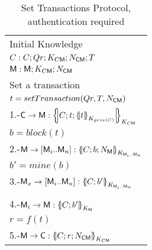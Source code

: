 \begin{table}[htb]
\footnotesize
\begin{center}
\caption{Set Transactions Protocol, authentication required}
\label{table:ProtSetTrans}
\begin{tabular}{|l|}
\hline
           Initial Knowledge                                                             \\
            $C:C; Qr ;  K_{C\textsf{M}} ; N_{\textsf{C}\textsf{M}} ; T$               \\
            $\textsf{M}: \textsf{M}; K_{C\textsf{M}} ; N_{\textsf{C}\textsf{M}}$    \\ \hline \hline 
           Set a transaction                                                                        \\
           \hspace{5mm} $t=setTransaction(Qr,T,N_{\textsf{C}\textsf{M}})$                                  \\  
           1.-$\Client\rightarrow \Server: \fat{C \lnk t \lnk \fat{t}_{K_{priv(C)}}}_{K_{C\Server}}$          \\ 
           \hspace{5mm} $b=block(t)$                                  \\  
           2.-$\Server\rightarrow [\Server_i .. \Server_n]: \fat{C \lnk b \lnk N_\Server}_{K_{\Server_i .. \Server_n}}$          \\ 
           \hspace{5mm} $b'=mine(b)$                                  \\  
           3.-$\Server_x\rightarrow [\Server_i .. \Server_n]: \fat{C \lnk b'}_{K_{\Server_i .. \Server_n}}$          \\            
                                             \\  
           4.-$\Server_i\rightarrow \Server: \fat{C \lnk b'}_{K_{\Server}}$          \\            
           \hspace{5mm} $r=f(t)$                                  \\  
           5.-$\Server\rightarrow \Client: \fat{C \lnk r \lnk N_{\Client\Server}}_{K_{C\Server}}$       \\  \hline \hline
\end{tabular}
\end{center}
\end{table}
\normalsize
